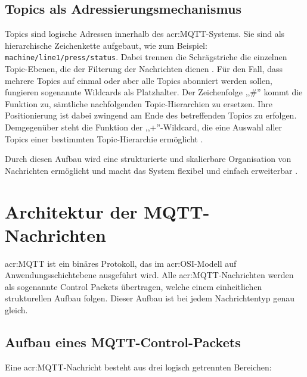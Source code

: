     \subsection{Topics als Adressierungsmechanismus}
        Topics sind logische Adressen innerhalb des \gls{acr:MQTT}-Systems. Sie sind als hierarchische Zeichenkette aufgebaut, wie zum Beispiel: \texttt{machine/line1/press/status}. Dabei trennen die Schrägstriche die einzelnen Topic-Ebenen, die der Filterung der Nachrichten dienen \autocite[19]{hivemqMQTTMQTT5}. Für den Fall, dass mehrere Topics auf einmal oder aber alle Topics abonniert werden sollen, fungieren sogenannte Wildcards als Platzhalter.   Der Zeichenfolge ,,\#'' kommt die Funktion zu, sämtliche nachfolgenden Topic-Hierarchien zu ersetzen. Ihre Positionierung ist dabei zwingend am Ende des betreffenden Topics zu erfolgen. Demgegenüber steht die Funktion der ,,+''-Wildcard, die eine Auswahl aller Topics einer bestimmten Topic-Hierarchie ermöglicht \autocite[120]{angewandteNetzwerktechnik}.
        
        Durch diesen Aufbau wird eine strukturierte und skalierbare Organisation von Nachrichten ermöglicht und macht das System flexibel und einfach erweiterbar \autocite[21]{hivemqMQTTMQTT5}. 



\section{Architektur der MQTT-Nachrichten}
    \acrshort{acr:MQTT} ist ein binäres Protokoll, das im \gls{acr:OSI}-Modell auf Anwendungsschichtebene ausgeführt wird. 
    Alle \acrshort{acr:MQTT}-Nachrichten werden als sogenannte Control Packets übertragen, welche einem einheitlichen strukturellen Aufbau folgen. 
    Dieser Aufbau ist bei jedem Nachrichtentyp genau gleich. \autocite[21--29]{oasisMQTTVersion502019}

    \subsection{Aufbau eines MQTT-Control-Packets}
        Eine \acrshort{acr:MQTT}-Nachricht besteht aus drei logisch getrennten Bereichen:

